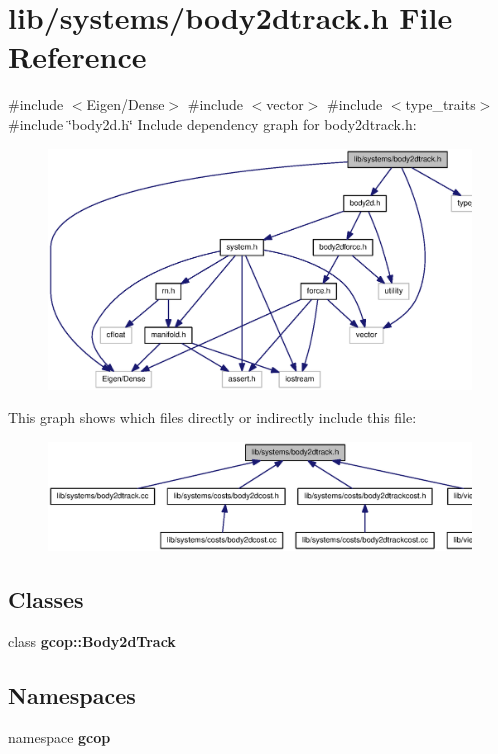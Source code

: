 \section{lib/systems/body2dtrack.h \-File \-Reference}
\label{body2dtrack_8h}
{\ttfamily \#include $<$\-Eigen/\-Dense$>$}\*
{\ttfamily \#include $<$vector$>$}\*
{\ttfamily \#include $<$type\-\_\-traits$>$}\*
{\ttfamily \#include \char`\"{}body2d.\-h\char`\"{}}\*
\-Include dependency graph for body2dtrack.\-h\-:\nopagebreak
\begin{figure}[H]
\begin{center}
\leavevmode
\includegraphics[width=350pt]{body2dtrack_8h__incl}
\end{center}
\end{figure}
\-This graph shows which files directly or indirectly include this file\-:\nopagebreak
\begin{figure}[H]
\begin{center}
\leavevmode
\includegraphics[width=350pt]{body2dtrack_8h__dep__incl}
\end{center}
\end{figure}
\subsection*{\-Classes}
\begin{DoxyCompactItemize}
\item 
class {\bf gcop\-::\-Body2d\-Track}
\end{DoxyCompactItemize}
\subsection*{\-Namespaces}
\begin{DoxyCompactItemize}
\item 
namespace {\bf gcop}
\end{DoxyCompactItemize}
